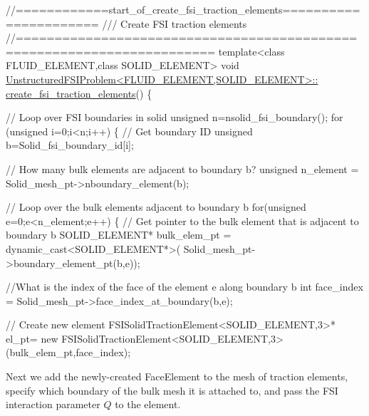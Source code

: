 \begin{DoxyCodeInclude}
\textcolor{comment}{//============start\_of\_create\_fsi\_traction\_elements======================}
\textcolor{comment}{/// Create FSI traction elements }
\textcolor{comment}{}\textcolor{comment}{//=======================================================================}
\textcolor{keyword}{template}<\textcolor{keyword}{class} FLUID\_ELEMENT,\textcolor{keyword}{class} SOLID\_ELEMENT>
\textcolor{keywordtype}{void} \hyperlink{classUnstructuredFSIProblem_a934a587c99668fca969a72814b3142a7}{UnstructuredFSIProblem<FLUID\_ELEMENT,SOLID\_ELEMENT>::}
\hyperlink{classUnstructuredFSIProblem_a934a587c99668fca969a72814b3142a7}{create\_fsi\_traction\_elements}()
\{

 \textcolor{comment}{// Loop over FSI boundaries in solid}
 \textcolor{keywordtype}{unsigned} n=nsolid\_fsi\_boundary();
 \textcolor{keywordflow}{for} (\textcolor{keywordtype}{unsigned} i=0;i<n;i++)
  \{
   \textcolor{comment}{// Get boundary ID}
   \textcolor{keywordtype}{unsigned} b=Solid\_fsi\_boundary\_id[i];
   
   \textcolor{comment}{// How many bulk elements are adjacent to boundary b?}
   \textcolor{keywordtype}{unsigned} n\_element = Solid\_mesh\_pt->nboundary\_element(b);
   
   \textcolor{comment}{// Loop over the bulk elements adjacent to boundary b}
   \textcolor{keywordflow}{for}(\textcolor{keywordtype}{unsigned} e=0;e<n\_element;e++)
    \{
     \textcolor{comment}{// Get pointer to the bulk element that is adjacent to boundary b}
     SOLID\_ELEMENT* bulk\_elem\_pt = \textcolor{keyword}{dynamic\_cast<}SOLID\_ELEMENT*\textcolor{keyword}{>}(
      Solid\_mesh\_pt->boundary\_element\_pt(b,e));
     
     \textcolor{comment}{//What is the index of the face of the element e along boundary b}
     \textcolor{keywordtype}{int} face\_index = Solid\_mesh\_pt->face\_index\_at\_boundary(b,e);
     
     \textcolor{comment}{// Create new element }
     FSISolidTractionElement<SOLID\_ELEMENT,3>* el\_pt=
      \textcolor{keyword}{new} FSISolidTractionElement<SOLID\_ELEMENT,3>(bulk\_elem\_pt,face\_index);

\end{DoxyCodeInclude}


Next we add the newly-\/created {\ttfamily Face\+Element} to the mesh of traction elements, specify which boundary of the bulk mesh it is attached to, and pass the F\+SI interaction parameter $ Q $ to the element.


